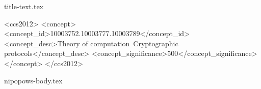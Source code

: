 \documentclass[sigconf, anonymous]{acmart}
\begin{document}
{title-text.tex}

\begin{abstract}

\end{abstract}

\begin{CCSXML}
<ccs2012>
<concept>
<concept_id>10003752.10003777.10003789</concept_id>
<concept_desc>Theory of computation~Cryptographic protocols</concept_desc>
<concept_significance>500</concept_significance>
</concept>
</ccs2012>
\end{CCSXML}



\maketitle

% 
% 
% 
% 
% 
% 

{nipopows-body.tex}

\newpage



% 
% 
% 
% 


% 

\end{document}
